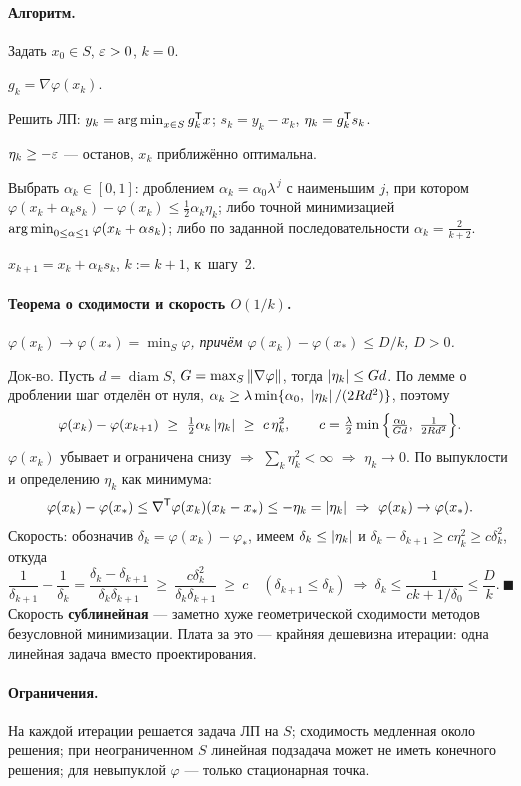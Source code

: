 \paragraph{Алгоритм.}
\begin{csteps}
  \item Задать $x_0 \in S$, $\varepsilon > 0$, $k = 0$.
  \item $g_k = \nabla\varphi(x_k)$.
  \item Решить ЛП: $y_k = \operatorname*{arg\,min}_{x\in S} g_k^{\mathsf{T}} x$; $s_k = y_k - x_k$,
        $\eta_k = g_k^{\mathsf{T}} s_k$.
  \item $\eta_k \ge -\varepsilon$ — останов, $x_k$ приближённо оптимальна.
  \item Выбрать $\alpha_k \in [0,1]$: дроблением
        $\alpha_k = \alpha_0\lambda^{\,j}$ с наименьшим $j$, при котором
        $\varphi(x_k + \alpha_k s_k) - \varphi(x_k) \le
         \tfrac12\alpha_k\eta_k$; либо точной минимизацией
        $\operatorname*{arg\,min}_{0\le\alpha\le1}\varphi(x_k+\alpha s_k)$; либо по заданной
        последовательности $\alpha_k = \frac{2}{k+2}$.
  \item $x_{k+1} = x_k + \alpha_k s_k$, $k := k+1$, к~шагу~2.
\end{csteps}

\paragraph{Теорема о сходимости и скорость $O(1/k)$.}
\textit{$\varphi(x_k) \to \varphi(x_*) = \min_S\varphi$, причём
$\varphi(x_k) - \varphi(x_*) \le D/k$, $D > 0$.}

\textsc{Док-во.} Пусть $d = \operatorname{diam}S$,
$G = \max_S\left\lVert \nabla\varphi \right\rVert$, тогда $\left\lvert \eta_k \right\rvert \le Gd$. По лемме о
дроблении шаг отделён от нуля,
$\alpha_k \ge \lambda\min\{\alpha_0,\ \left\lvert \eta_k \right\rvert/(2Rd^2)\}$, поэтому
\[
  \varphi(x_k) - \varphi(x_{k+1}) \ \ge\ \tfrac12\alpha_k\abs{\eta_k}
   \ \ge\ c\,\eta_k^2 ,
  \qquad
  c = \tfrac{\lambda}{2}\min\Big\{\tfrac{\alpha_0}{Gd},\ \tfrac{1}{2Rd^2}\Big\} .
\]
$\varphi(x_k)$ убывает и ограничена снизу $\Rightarrow$
$\sum_k\eta_k^2 < \infty$ $\Rightarrow$ $\eta_k \to 0$. По выпуклости и
определению $\eta_k$ как минимума:
\[
  \varphi(x_k) - \varphi(x_*) \le \nabla^{\mathsf{T}}\varphi(x_k)(x_k - x_*)
   \le -\eta_k = \left\lvert \eta_k \right\rvert
   \ \Rightarrow\ \varphi(x_k) \to \varphi(x_*) .
\]
Скорость: обозначив $\delta_k = \varphi(x_k) - \varphi_*$, имеем
$\delta_k \le \left\lvert \eta_k \right\rvert$ и $\delta_k - \delta_{k+1} \ge c\eta_k^2
\ge c\delta_k^2$, откуда
\[
  \frac{1}{\delta_{k+1}} - \frac{1}{\delta_k}
   = \frac{\delta_k - \delta_{k+1}}{\delta_k\delta_{k+1}}
   \ \ge\ \frac{c\delta_k^2}{\delta_k\delta_{k+1}} \ \ge\ c
  \quad (\delta_{k+1} \le \delta_k)
  \ \Rightarrow\ \delta_k \le \frac{1}{ck + 1/\delta_0} \le \frac{D}{k} .
  \ \blacksquare
\]
Скорость \textbf{сублинейная} — заметно хуже геометрической сходимости методов
безусловной минимизации. Плата за это — крайняя дешевизна итерации: одна
линейная задача вместо проектирования.

\paragraph{Ограничения.}
На каждой итерации решается задача ЛП на $S$; сходимость медленная около
решения; при неограниченном $S$ линейная подзадача может не иметь конечного
решения; для невыпуклой $\varphi$ — только стационарная точка.

